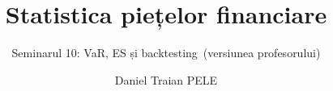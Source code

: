 \title[Statistica piețelor financiare]{Statistica piețelor financiare}
\subtitle{Seminarul 10: VaR, ES și backtesting\ifsolutions\ (versiunea profesorului)\fi}
\author[D.T. Pele]{Daniel Traian PELE}
\date{}

\providecommand{\sfmapplink}[3]{\hypertarget{#2}{}\hyperlink{#1}{\beamergotobutton{#3}}}  %
\providecommand{\sfmappback}[2]{\begin{tikzpicture}[remember picture,overlay]\node[anchor=south east] at ([xshift=-3mm,yshift=7mm]current page.south east){\hyperlink{#1}{\beamerreturnbutton{#2}}};\end{tikzpicture}}  %
\providecommand{\sfmchlink}[2]{\href{#1}{#2}}  %
\providecommand{\sfmchlinkt}[2]{\href{#1}{\usebeamercolor[fg]{frametitle}#2}}  %


